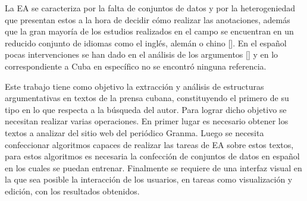 

La EA se caracteriza por la falta de conjuntos de datos y 
por la heterogeniedad que presentan estos a la hora de decidir cómo realizar las 
anotaciones, además que la gran mayoría de los estudios realizados en el campo se encuentran en 
un reducido conjunto de idiomas como el inglés, alemán o chino [\cite{eger2018cross}]. 
En el español pocas intervenciones se han dado en el análisis de los argumentos [\cite{esteve2020mineria}] y en 
lo correspondiente a Cuba en específico no se encontró ninguna referencia. 


Este trabajo tiene como objetivo la extracción y análisis de estructuras argumentativas en textos 
de la prensa cubana, constituyendo el primero de su tipo en lo que respecta a la búsqueda del autor. 
Para lograr dicho objetivo se necesitan realizar varias operaciones.
En primer lugar es necesario obtener los textos a analizar del sitio 
web del periódico Granma. Luego se necesita confeccionar algoritmos capaces de realizar las tareas 
de EA sobre estos textos, para estos algoritmos es necesaria la confección de conjuntos 
de datos en español en los cuales se puedan entrenar. Finalmente se requiere de una interfaz visual 
en la que sea posible la interacción de los usuarios, en tareas como visualización y edición, 
con los resultados obtenidos. 

